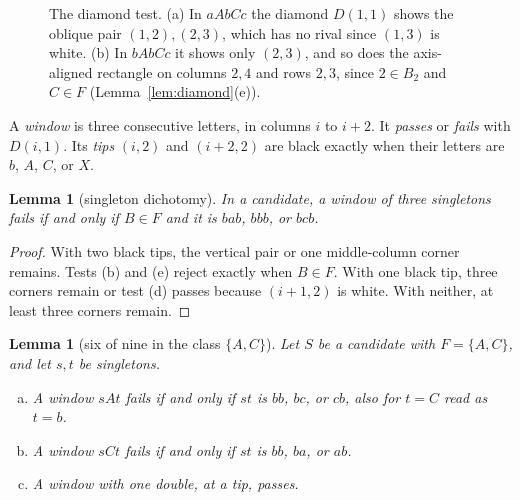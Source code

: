 \documentclass[12pt]{article}
\theoremstyle{plain}
\newtheorem{lemma}[theorem]{Lemma}
\theoremstyle{definition}
\theoremstyle{remark}
\begin{document}
\begin{figure}[t]
\caption{The diamond test. (a) In $aAbCc$ the diamond $D(1,1)$ shows the oblique pair $(1,2),(2,3)$, which has no rival since $(1,3)$ is white. (b) In $bAbCc$ it shows only $(2,3)$, and so does the axis-aligned rectangle on columns $2,4$ and rows $2,3$, since $2\in B_2$ and $C\in F$ (Lemma~\ref{lem:diamond}(e)).}
\label{fig:diamond}
\end{figure}

A \emph{window} is three consecutive letters, in columns $i$ to $i+2$.
It \emph{passes} or \emph{fails} with $D(i,1)$.
Its \emph{tips} $(i,2)$ and $(i+2,2)$ are black exactly when their letters
are $b$, $A$, $C$, or $X$.

\begin{lemma}[singleton dichotomy]\label{lem:dichotomy}
In a candidate, a window of three singletons fails if and only if $B\in F$ and it is
$bab$, $bbb$, or $bcb$.
\end{lemma}

\begin{proof}
With two black tips, the vertical pair or one middle-column corner
remains. Tests (b) and (e) reject exactly when $B\in F$.
With one black tip, three corners remain or test (d) passes because
$(i+1,2)$ is white. With neither, at least three corners remain.
\end{proof}

\begin{lemma}[six of nine in the class $\{A,C\}$]\label{lem:sixofnine}
Let $S$ be a candidate with $F=\{A,C\}$, and let $s,t$ be singletons.
\begin{enumerate}[(a)]
\item A window $sAt$ fails if and only if $st$ is $bb$, $bc$, or $cb$, also for $t=C$ read
as $t=b$.
\item A window $sCt$ fails if and only if $st$ is $bb$, $ba$, or $ab$.
\item A window with one double, at a tip, passes.
\end{enumerate}
\end{lemma}
\end{document}
